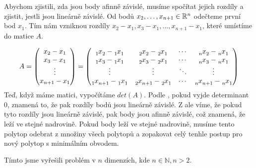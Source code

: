 Abychom zjistili, zda jsou body afinně závislé, musíme spočítat jejich rozdíly a zjistit, jestli jsou lineárně závislé. Od bodů $x_2, \ldots, x_{n+1} \in \mathbb{R}^n$ odečteme první bod $x_1$. Tím nám vzniknou rozdíly $x_2-x_1, x_3-x_1, \dots, x_{n+1}-x_1$, které umístíme do matice $A$. 


\begingroup
\renewcommand*{\arraystretch}{1.25}
\delimitershortfall=0pt
\begin{equation*}
  A =
  \begin{pmatrix}
    x_2-x_1 \\
    x_3-x_1 \\
    \vdots  \\
    x_{n+1}-x_1
  \end{pmatrix}
  =
  \begin{pmatrix}
    \x{1}{2} - \x{1}{1} & \x{2}{2} - \x{2}{1} & \cdots & \x{n}{2} - \x{n}{1} \\
    \x{1}{3} - \x{1}{1} & \x{2}{3} - \x{2}{1} & \cdots & \x{n}{3} - \x{n}{1} \\
    \vdots        & \vdots        & \ddots & \vdots        \\
    \x{1}{n_+_1} - \x{1}{1} & \x{2}{n_+_1} - \x{2}{1} & \cdots & \x{n}{n_+_1} - \x{n}{1} \\
  \end{pmatrix}
\end{equation*}
\endgroup
Teď, když máme matici, vypočítáme $det(A)$. Podle , pokud vyjde determinant $0$, znamená to, že pak rozdíly bodů jsou lineárně závislé. Z  ale víme, že pokud tyto rozdíly jsou lineárně závislé, pak body jsou afinně závislé, což znamená, že leží ve stejné nadrovině. Pokud body leží ve stejné nadrovině, musíme tento polytop odebrat z množiny všech polytopů a zopakovat celý tenhle postup pro nový polytop s minimálním obvodem. 

Tímto jsme vyřešili problém v $n$ dimenzích, kde $n \in \mathbb{N}, n > 2$.